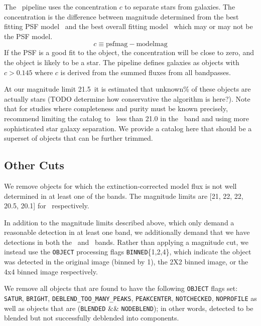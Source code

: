 \documentclass[preprint]{aastex}
\newcommand{\rmax}{21.5}
\newcommand{\contam}{unknown}
\begin{document}
The \photo\ pipeline uses the concentration $c$ to separate stars from
galaxies.  The concentration is the difference between magnitude determined
from the best fitting PSF model \psfmag\ and the best overall fitting model 
\modelmag\ which may or may not be the PSF model.
\begin{equation}
c \equiv \textrm{psfmag} - \textrm{modelmag}
\end{equation}
If the PSF is a good fit to the object, the concentration will be close to
zero, and the object is likely to be a star. The pipeline defines galaxies as
objects with $c > 0.145$ \citep{dr7classify} where $c$ is derived from the
summed fluxes from all bandpasses.  

At our magnitude limit \rmax\ it is estimated that \contam\% of these objects
are actually stars (TODO determine how conservative the algorithm is here?).
Note that for studies where completeness and purity must be known precisely,
\citet{ScrantonMag05} recommend limiting the catalog to \cmodelmag\ less than
21.0 in the \rmag\ band and using more sophisticated star galaxy separation. We
provide a catalog here that should be a superset of objects that can be further
trimmed.

\subsection{Other Cuts}

We remove objects for which the extinction-corrected model flux is not well
determined in at least one of the bands.  The magnitude limits are [21, 22, 22,
20.5, 20.1] for \allmag\ respectively.

In addition to the magnitude limits described above, which only demand a
reasonable detection in at least one band, we additionally demand that we have
detections in both the \rmag\ and \imag\ bands.  Rather than applying a
magnitude cut, we instead use the \texttt{OBJECT} processing flags
\texttt{BINNED}\{1,2,4\}, which indicate the object was detected in the original
image (binned by 1), the 2X2 binned image, or the 4x4 binned image respectively.

We remove all objects that are found to have the following \texttt{OBJECT}
flags set: \texttt{SATUR}, \texttt{BRIGHT}, \texttt{DEBLEND\_TOO\_MANY\_PEAKS},
\texttt{PEAKCENTER}, \texttt{NOTCHECKED}, \texttt{NOPROFILE} as well as objects
that are (\texttt{BLENDED} \&\& \texttt{NODEBLEND}); in other words, detected
to be blended but not successfully deblended into components. 
\end{document}
